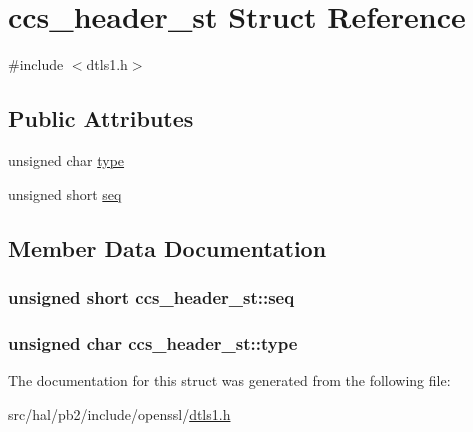 \hypertarget{structccs__header__st}{}\section{ccs\+\_\+header\+\_\+st Struct Reference}
\label{structccs__header__st}


{\ttfamily \#include $<$dtls1.\+h$>$}

\subsection*{Public Attributes}
\begin{DoxyCompactItemize}
\item 
unsigned char \hyperlink{structccs__header__st_a9dc6e844d9a62957f26d52d475a1f7cb}{type}
\item 
unsigned short \hyperlink{structccs__header__st_a08082f09ae8c97f2e5096ec64ba20cb3}{seq}
\end{DoxyCompactItemize}


\subsection{Member Data Documentation}
\subsubsection[{\texorpdfstring{seq}{seq}}]{\setlength{\rightskip}{0pt plus 5cm}unsigned short ccs\+\_\+header\+\_\+st\+::seq}\hypertarget{structccs__header__st_a08082f09ae8c97f2e5096ec64ba20cb3}{}\label{structccs__header__st_a08082f09ae8c97f2e5096ec64ba20cb3}
\subsubsection[{\texorpdfstring{type}{type}}]{\setlength{\rightskip}{0pt plus 5cm}unsigned char ccs\+\_\+header\+\_\+st\+::type}\hypertarget{structccs__header__st_a9dc6e844d9a62957f26d52d475a1f7cb}{}\label{structccs__header__st_a9dc6e844d9a62957f26d52d475a1f7cb}


The documentation for this struct was generated from the following file\+:\begin{DoxyCompactItemize}
\item 
src/hal/pb2/include/openssl/\hyperlink{dtls1_8h}{dtls1.\+h}\end{DoxyCompactItemize}
